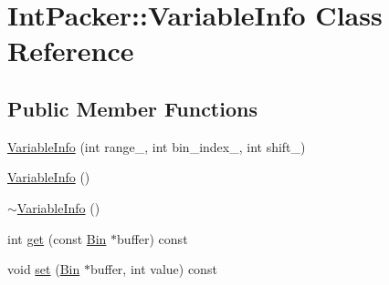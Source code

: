 \hypertarget{classIntPacker_1_1VariableInfo}{\section{Int\-Packer\-:\-:Variable\-Info Class Reference}
\label{classIntPacker_1_1VariableInfo}
}
\subsection*{Public Member Functions}
\begin{DoxyCompactItemize}
\item 
\hyperlink{classIntPacker_1_1VariableInfo_a788bbdd083529631308d4ffe6b09da1e}{Variable\-Info} (int range\-\_\-, int bin\-\_\-index\-\_\-, int shift\-\_\-)
\item 
\hyperlink{classIntPacker_1_1VariableInfo_a7c24ea8cd92e74d520e7ebd3ee942ac6}{Variable\-Info} ()
\item 
\hyperlink{classIntPacker_1_1VariableInfo_a44b080ca8ea386c452f3ee6d520ccc5b}{$\sim$\-Variable\-Info} ()
\item 
int \hyperlink{classIntPacker_1_1VariableInfo_ac28843c7e95eaa1cddde6b09ba3fbcb0}{get} (const \hyperlink{classIntPacker_aaba4fb76f4a256591346d2a8b4119b0f}{Bin} $\ast$buffer) const 
\item 
void \hyperlink{classIntPacker_1_1VariableInfo_a1c0f791e1e5d0dde211281c6fb4e584d}{set} (\hyperlink{classIntPacker_aaba4fb76f4a256591346d2a8b4119b0f}{Bin} $\ast$buffer, int value) const 
\end{DoxyCompactItemize}


